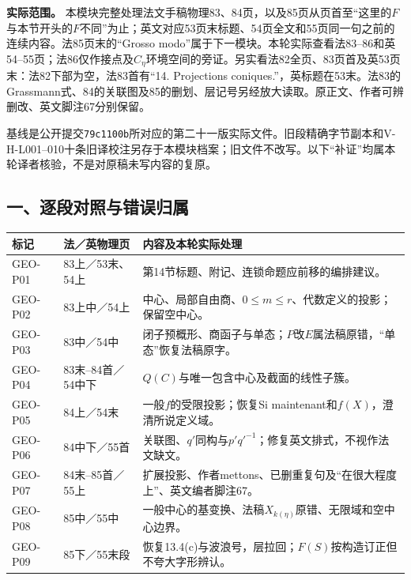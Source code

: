 
\noindent\textbf{实际范围。}
本模块完整处理法文手稿物理83、84页，以及85页从页首至“这里的$F$与本节开头的$F$不同”为止；英文对应53页末标题、54页全文和55页同一句之前的连续内容。法85页末的“Grosso modo”属于下一模块。本轮实际查看法83--86和英54--55页；法86仅作接点及$C_\eta$环境空间的旁证。另实看法82全页、83页首及英53页末：法82下部为空，法83首有“14. Projections coniques.”，英标题在53末。法83的Grassmann式、84的关联图及85的删划、层记号另经放大读取。原正文、作者可辨删改、英文脚注67分别保留。

基线是公开提交\texttt{79c1100b}所对应的第二十一版实际文件。旧段精确字节副本和V-H-L001--010十条旧译校注另存于本模块档案；旧文件不改写。以下“补证”均属本轮译者核验，不是对原稿未写内容的复原。

\subsection*{一、逐段对照与错误归属}
\begin{longtable}{@{}p{.14\linewidth}p{.19\linewidth}p{.56\linewidth}@{}}
\toprule 标记 & 法／英物理页 & 内容及本轮实际处理\\\midrule\endhead
GEO-P01 & 83上／53末、54上 & 第14节标题、附记、连锁命题应前移的编排建议。\\
GEO-P02 & 83上中／54上 & 中心、局部自由商、$0\le m\le r$、代数定义的投影；保留空中心。\\
GEO-P03 & 83中／54中 & 闭子预概形、商函子与单态；$P$改$E$属法稿原错，“单态”恢复法稿原字。\\
GEO-P04 & 83末--84首／54中下 & $Q(C)$与唯一包含中心及截面的线性子簇。\\
GEO-P05 & 84上／54末 & 一般$f$的受限投影；恢复Si maintenant和$f(X)$，澄清所说定义域。\\
GEO-P06 & 84中下／55首 & 关联图、$q'$同构与$p'q'^{-1}$；修复英文排式，不视作法文缺文。\\
GEO-P07 & 84末--85首／55上 & 扩展投影、作者mettons、已删重复句及“在很大程度上”、英文编者脚注67。\\
GEO-P08 & 85中／55中 & 一般中心的基变换、法稿$X_{k(\eta)}$原错、无限域和空中心边界。\\
GEO-P09 & 85下／55末段 & 恢复13.4(c)与波浪号，层拉回；$F(S)$按构造订正但不夸大字形辨认。\\
\bottomrule
\end{longtable}

